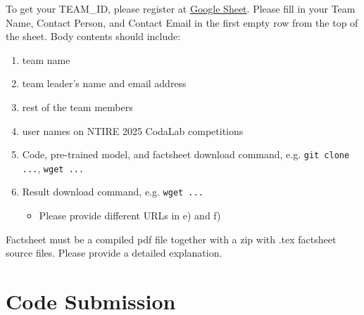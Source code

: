 \documentclass[10pt,twocolumn,letterpaper]{article}
\begin{document}
To get your TEAM\_ID, please register at \href{https://docs.google.com/spreadsheets/d/1j6Rzt6St70lqbYi0f74le9qDiouj5suF35xOm2o5C9I/edit?usp=sharing}{Google Sheet}. Please fill in your Team Name, Contact Person, and Contact Email in the first empty row from the top of the sheet.
% 
Body contents should include: 

\begin{enumerate}[label=\alph*)]
\item team name 

\item team leader's name and email address 

\item rest of the team members 

\item user names on NTIRE 2025 CodaLab competitions 

\item Code, pre-trained model, and factsheet download command, e.g. \texttt{git clone ...}, \texttt{wget ...}

\item Result download command, e.g. \texttt{wget ...}
\begin{itemize}
    \item Please provide different URLs in e) and f)
\end{itemize}
\end{enumerate}



\noindent Factsheet must be a compiled pdf file together with a zip with .tex factsheet source files. Please provide a detailed explanation.


\section{Code Submission}
\end{document}

